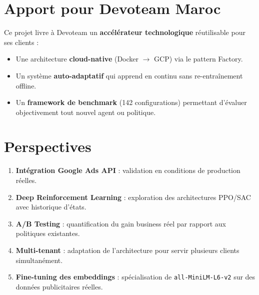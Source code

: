 \section*{Apport pour Devoteam Maroc}

Ce projet livre à Devoteam un \textbf{accélérateur technologique} réutilisable pour ses clients :

\begin{itemize}
    \item Une architecture \textbf{cloud-native} (Docker $\to$ GCP) via le pattern Factory.
    \item Un système \textbf{auto-adaptatif} qui apprend en continu sans re-entraînement offline.
    \item Un \textbf{framework de benchmark} (142 configurations) permettant d'évaluer objectivement tout nouvel agent ou politique.
\end{itemize}

\section*{Perspectives}

\begin{enumerate}
    \item \textbf{Intégration Google Ads API} : validation en conditions de production réelles.
    \item \textbf{Deep Reinforcement Learning} : exploration des architectures PPO/SAC avec historique d'états.
    \item \textbf{A/B Testing} : quantification du gain business réel par rapport aux politiques existantes.
    \item \textbf{Multi-tenant} : adaptation de l'architecture pour servir plusieurs clients simultanément.
    \item \textbf{Fine-tuning des embeddings} : spécialisation de \texttt{all-MiniLM-L6-v2} sur des données publicitaires réelles.
\end{enumerate}
